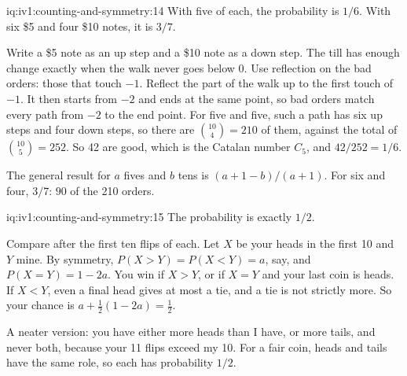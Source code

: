 \begin{solution}{iq:iv1:counting-and-symmetry:14}
With five of each, the probability is $1/6$. With six \$5 and four \$10 notes, it is $3/7$.

Write a \$5 note as an up step and a \$10 note as a down step. The till has enough change exactly when the walk never goes below 0. Use reflection on the bad orders: those that touch $-1$. Reflect the part of the walk up to the first touch of $-1$. It then starts from $-2$ and ends at the same point, so bad orders match every path from $-2$ to the end point. For five and five, such a path has six up steps and four down steps, so there are $\binom{10}{4} = 210$ of them, against the total of $\binom{10}{5} = 252$. So 42 are good, which is the Catalan number $C_5$, and $42/252 = 1/6$.

The general result for $a$ fives and $b$ tens is $(a + 1 - b)/(a + 1)$. For six and four, $3/7$: $90$ of the 210 orders.

\end{solution}

\begin{solution}{iq:iv1:counting-and-symmetry:15}
The probability is exactly $1/2$.

Compare after the first ten flips of each. Let $X$ be your heads in the first 10 and $Y$ mine. By symmetry, $P(X > Y) = P(X < Y) = a$, say, and $P(X = Y) = 1 - 2a$. You win if $X > Y$, or if $X = Y$ and your last coin is heads. If $X < Y$, even a final head gives at most a tie, and a tie is not strictly more. So your chance is $a + \tfrac12(1 - 2a) = \tfrac12$.

A neater version: you have either more heads than I have, or more tails, and never both, because your 11 flips exceed my 10. For a fair coin, heads and tails have the same role, so each has probability $1/2$.

\end{solution}

